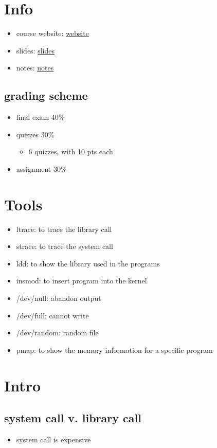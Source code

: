 \documentclass[11pt]{article}
\author{Yiping Deng}
\date{\today}
\title{}
\begin{document}
\tableofcontents

\section{Info}
\label{sec:org90fee3a}
\begin{itemize}
\item course website: \href{https://cnds.jacobs-university.de/courses/os-2018/}{website}
\item slides: \href{./os\_slides.pdf\#20}{slides}
\item notes: \href{./os\_notes.pdf}{notes}
\end{itemize}
\subsection{grading scheme}
\label{sec:orgea74e9c}
\begin{itemize}
\item final exam 40\%
\item quizzes 30\%
\begin{itemize}
\item 6 quizzes, with 10 pts each
\end{itemize}
\item assignment 30\%
\end{itemize}
\section{Tools}
\label{sec:org6bfe085}
\begin{itemize}
\item ltrace: to trace the library call
\item strace: to trace the system call
\item ldd: to show the library used in the programs
\item insmod: to insert program into the kernel
\item /dev/null: abandon output
\item /dev/full: cannot write
\item /dev/random: random file
\item pmap: to show the memory information for a specific program
\end{itemize}
\section{Intro}
\label{sec:org0fb52e5}
\subsection{system call v. library call}
\label{sec:org5270b76}
\begin{itemize}
\item system call is expensive
\end{itemize}
\end{document}

